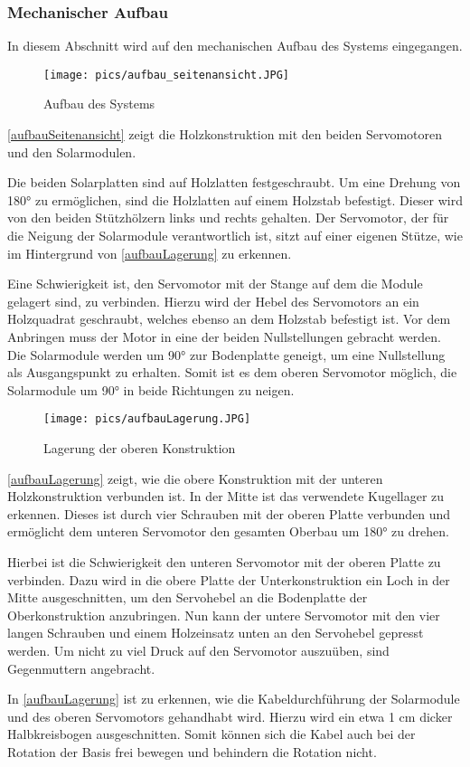 \subsubsection{Mechanischer Aufbau}

In diesem Abschnitt wird auf den mechanischen Aufbau des Systems eingegangen.

\begin{figure}[htpb] %
    \centering
    \texttt{[image: pics/aufbau\_seitenansicht.JPG]}
    \caption{Aufbau des Systems}\label{aufbauSeitenansicht}
\end{figure}

\autoref{aufbauSeitenansicht} zeigt die Holzkonstruktion mit den beiden Servomotoren und den Solarmodulen.

Die beiden Solarplatten sind auf Holzlatten festgeschraubt. 
Um eine Drehung von 180° zu ermöglichen, sind die Holzlatten auf einem Holzstab befestigt.
Dieser wird von den beiden Stützhölzern links und rechts gehalten. 
Der Servomotor, der für die Neigung der Solarmodule verantwortlich ist, sitzt auf einer eigenen Stütze, wie im Hintergrund von \autoref{aufbauLagerung} zu erkennen.

Eine Schwierigkeit ist, den Servomotor mit der Stange auf dem die Module gelagert sind, zu verbinden.
Hierzu wird der Hebel des Servomotors an ein Holzquadrat geschraubt, welches ebenso an dem Holzstab befestigt ist.
Vor dem Anbringen muss der Motor in eine der beiden Nullstellungen gebracht werden.
Die Solarmodule werden um 90° zur Bodenplatte geneigt, um eine Nullstellung als Ausgangspunkt zu erhalten. 
Somit ist es dem oberen Servomotor möglich, die Solarmodule um 90° in beide Richtungen zu neigen.

\begin{figure}[htpb] %
    \centering
    \texttt{[image: pics/aufbauLagerung.JPG]}
    \caption{Lagerung der oberen Konstruktion}\label{aufbauLagerung}
\end{figure}

\autoref{aufbauLagerung} zeigt, wie die obere Konstruktion mit der unteren Holzkonstruktion verbunden ist.
In der Mitte ist das verwendete Kugellager zu erkennen. 
Dieses ist durch vier Schrauben mit der oberen Platte verbunden und ermöglicht dem unteren Servomotor den gesamten Oberbau um 180° zu drehen.

Hierbei ist die Schwierigkeit den unteren Servomotor mit der oberen Platte zu verbinden. 
Dazu wird in die obere Platte der Unterkonstruktion ein Loch in der Mitte ausgeschnitten, um den Servohebel an die Bodenplatte der Oberkonstruktion anzubringen.
Nun kann der untere Servomotor mit den vier langen Schrauben und einem Holzeinsatz unten an den Servohebel gepresst werden. 
Um nicht zu viel Druck auf den Servomotor auszuüben, sind Gegenmuttern angebracht.

In \autoref{aufbauLagerung} ist zu erkennen, wie die Kabeldurchführung der Solarmodule und des oberen Servomotors gehandhabt wird. 
Hierzu wird ein etwa 1 cm dicker Halbkreisbogen ausgeschnitten. 
Somit können sich die Kabel auch bei der Rotation der Basis frei bewegen und behindern die Rotation nicht.